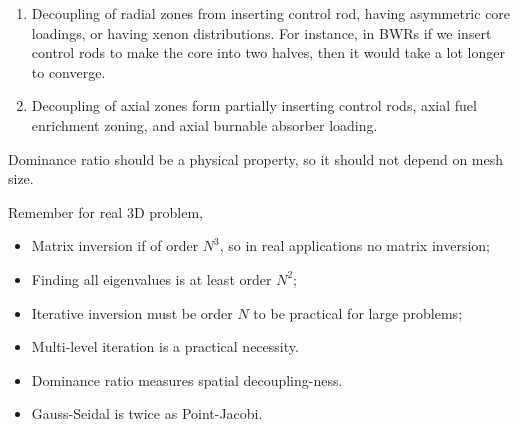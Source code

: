\documentclass{school-22.211-notes}
\begin{document}
\begin{enumerate}
\item Decoupling of radial zones from inserting control rod, having asymmetric core loadings, or having xenon distributions. For instance, in BWRs if we insert control rods to make the core into two halves, then it would take a lot longer to converge. 

\item Decoupling of axial zones form partially inserting control rods, axial fuel enrichment zoning, and axial burnable absorber loading. 
\end{enumerate}
Dominance ratio should be a physical property, so it should not depend on mesh size. 

\clearpage
{}
Remember for real 3D problem,
\begin{itemize}
\item Matrix inversion if of order $N^3$, so in real applications no matrix inversion;
\item Finding all eigenvalues is at least order $N^2$;
\item Iterative inversion must be order $N$ to be practical for large problems;
\item Multi-level iteration is a practical necessity. 
\item Dominance ratio measures spatial decoupling-ness.
\item Gauss-Seidal is twice as Point-Jacobi. 
\end{itemize}
\end{document}
